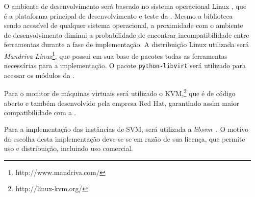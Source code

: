O ambiente de desenvolvimento será baseado no sistema operacional Linux
\cite{morimoto2004entendendo}, que é a plataforma principal de
desenvolvimento e teste da \libvirt{}. Mesmo a biblioteca sendo acessível
de qualquer sistema operacional, a proximidade com o ambiente de
desenvolvimento diminui a probabilidade de encontrar incompatibilidade
entre ferramentas durante a fase de implementação. A distribuição Linux
utilizada será \emph{Mandriva Linux}\footnote{http://www.mandriva.com/},
que possui em sua base de pacotes todas as ferramentas necessárias para a
implementação. O pacote \texttt{python-libvirt} será utilizado para acessar
os módulos da \libvirt{}.

Para o monitor de máquinas virtuais será utilizado o
KVM,\footnote{http://linux-kvm.org/} que é de código aberto e também
desenvolvido pela empresa Red Hat, garantindo assim maior compatibilidade
com a \libvirt{}.

Para a implementação das instâncias de SVM, será utilizada a
\emph{libsvm}~\cite{chang2001libsvm}. O motivo da escolha desta
implementação deve-se se em razão de sua licença, que permite uso e
distribuição, incluindo uso comercial.
